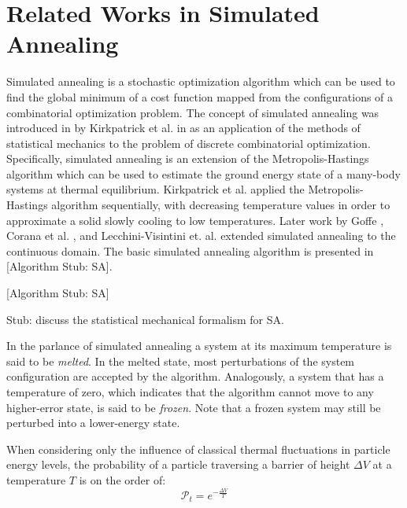\documentclass[11pt]{afthesis}
\begin{document}
	\section{Related Works in Simulated Annealing} \label{eq:simulatedAnnealing}
	
	
	
	Simulated annealing is a stochastic optimization algorithm which can be used to find the global minimum of a cost function mapped from the configurations of a combinatorial optimization problem. The concept of simulated annealing was introduced in by Kirkpatrick et al. in \cite{kirkpatrick1983} as an application of the methods of statistical mechanics to the problem of discrete combinatorial optimization. Specifically, simulated annealing is an extension of the Metropolis-Hastings \cite{metropolis1953} algorithm which can be used to estimate the ground energy state of a many-body systems at thermal equilibrium. Kirkpatrick et al. applied the Metropolis-Hastings algorithm sequentially, with decreasing temperature values in order to approximate a solid slowly cooling to low temperatures. Later work by Goffe \cite{goffe1994globaloptimization}, Corana et al. \cite{corana1987minimizingmultimodal}, and Lecchini-Visintini et. al. \cite{lecchinivisintini2007sacontinuousgaruntees} extended simulated annealing to the continuous domain. The basic simulated annealing algorithm is presented in [Algorithm Stub: SA]. 
	
	[Algorithm Stub: SA]
	
	Stub: discuss the statistical mechanical formalism for SA.
	
	
	
	In the parlance of simulated annealing \cite{kirkpatrick1983} a system at its maximum temperature is said to be \textit{melted}. In the melted state, most perturbations of the system configuration are accepted by the algorithm. Analogously, a system that has a temperature of zero, which indicates that the algorithm cannot move to any higher-error state, is said to be \textit{frozen}. Note that a frozen system may still be perturbed into a lower-energy state.
	
	When considering only the influence of classical thermal fluctuations in particle energy levels, the probability of a particle traversing a barrier of height \begin{math} \Delta V \end{math} at a temperature \begin{math} T \end{math} is on the order of: \begin{equation} 
	\mathcal{P}_t = e^{-\frac{\Delta V}{T}} 
	\end{equation}
	
\end{document}
